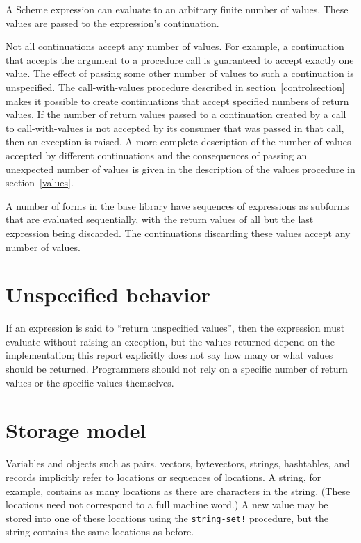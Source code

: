 A Scheme expression can evaluate to an arbitrary finite number of
values.  These values are passed to the expression's continuation.

Not all continuations accept any number of values. For example, a continuation that
accepts the argument to a procedure call is guaranteed to accept
exactly one value.  The effect of passing some other number of values
to such a continuation is unspecified.  The {\cf call-with-values}
procedure
described in section~\ref{controlsection} makes it possible to create
continuations that accept specified numbers of return values.
If the number of
return values passed to a continuation created by a call to
{\cf call-with-values} is not accepted by its consumer
that was passed in that call, then an exception is raised.
A more complete description of the number of values accepted by
different continuations and the consequences of passing an unexpected
number of values is given in the description of the {\cf values}
procedure in section~\ref{values}.

A number of forms in the base library have sequences of expressions
as subforms that are evaluated sequentially, with the return values of
all but the last expression being discarded.  The continuations
discarding these values accept any number of values.

\section{Unspecified behavior}

\vest If an expression is said to ``return unspecified values'',
then the expression must evaluate without raising an exception, but
the values returned depend on the implementation; this report
explicitly does not say how many or what values should be returned.
Programmers should not rely on a specific number of return values or
the specific values themselves.


\section{Storage model}
\label{storagemodel}

Variables and objects such as pairs, vectors, bytevectors, strings,
hashtables, and records implicitly
refer to locations or sequences of locations.  A string, for
example, contains as many locations as there are characters in the string.
(These locations need not correspond to a full machine word.) A new value may be
stored into one of these locations using the {\tt string-set!} procedure, but
the string contains the same locations as before.

